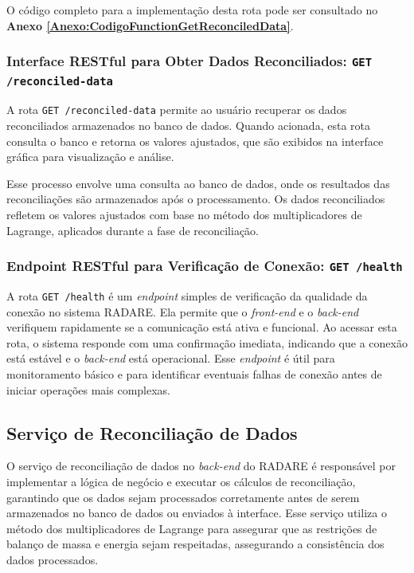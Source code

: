 O código completo para a implementação desta rota pode ser consultado no \textbf{Anexo \ref{Anexo:CodigoFunctionGetReconciledData}}.

\subsubsection{Interface RESTful para Obter Dados Reconciliados: \texttt{GET /reconciled-data}}

A rota \texttt{GET /reconciled-data} permite ao usuário recuperar os dados reconciliados armazenados no banco de dados. Quando acionada, esta rota consulta o banco e retorna os valores ajustados, que são exibidos na interface gráfica para visualização e análise.

Esse processo envolve uma consulta ao banco de dados, onde os resultados das reconciliações são armazenados após o processamento. Os dados reconciliados refletem os valores ajustados com base no método dos multiplicadores de Lagrange, aplicados durante a fase de reconciliação.

\subsubsection{Endpoint RESTful para Verificação de Conexão: \texttt{GET /health}}

A rota \texttt{GET /health} é um \textit{endpoint} simples de verificação da qualidade da conexão no sistema RADARE. Ela permite que o \textit{front-end} e o \textit{back-end} verifiquem rapidamente se a comunicação está ativa e funcional. Ao acessar esta rota, o sistema responde com uma confirmação imediata, indicando que a conexão está estável e o \textit{back-end} está operacional. Esse \textit{endpoint} é útil para monitoramento básico e para identificar eventuais falhas de conexão antes de iniciar operações mais complexas.

\subsection{Serviço de Reconciliação de Dados}

O serviço de reconciliação de dados no \textit{back-end} do RADARE é responsável por implementar a lógica de negócio e executar os cálculos de reconciliação, garantindo que os dados sejam processados corretamente antes de serem armazenados no banco de dados ou enviados à interface. Esse serviço utiliza o método dos multiplicadores de Lagrange para assegurar que as restrições de balanço de massa e energia sejam respeitadas, assegurando a consistência dos dados processados.

